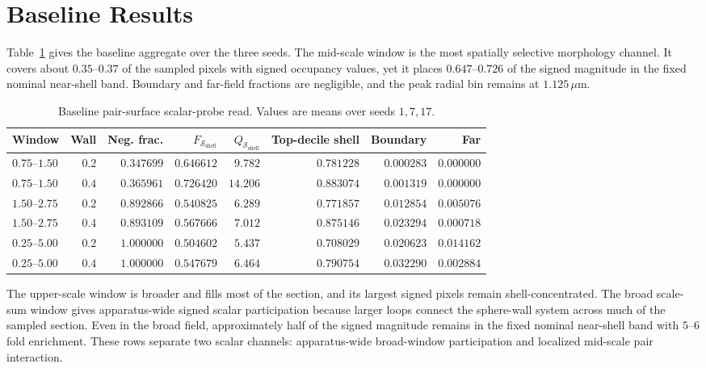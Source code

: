 \documentclass[11pt]{article}
\newcommand{\um}{\,\mu\mathrm{m}}
\newcommand{\shell}{\mathcal{S}_{\mathrm{shell}}}
\begin{document}
\section{Baseline Results}

Table~\ref{tab:baseline} gives the baseline aggregate over the three seeds.
The mid-scale window is the most spatially selective morphology channel. It covers about
$0.35$--$0.37$ of the sampled pixels with signed occupancy values, yet it places
$0.647$--$0.726$ of the signed magnitude in the fixed nominal near-shell band.
Boundary and far-field fractions are negligible, and the peak radial bin
remains at $1.125\um$.

\begin{table}[htbp]
\centering
\caption{Baseline pair-surface scalar-probe read. Values are means over seeds $1,7,17$.}
\label{tab:baseline}
\small
\begin{tabular}{lrrrrrrr}
\toprule
Window & Wall & Neg. frac. & $F_{\shell}$ & $Q_{\shell}$ & Top-decile shell & Boundary & Far \\
\midrule
$0.75$--$1.50$ & $0.2$ & $0.347699$ & $0.646612$ & $9.782$ & $0.781228$ & $0.000283$ & $0.000000$ \\
$0.75$--$1.50$ & $0.4$ & $0.365961$ & $0.726420$ & $14.206$ & $0.883074$ & $0.001319$ & $0.000000$ \\
$1.50$--$2.75$ & $0.2$ & $0.892866$ & $0.540825$ & $6.289$ & $0.771857$ & $0.012854$ & $0.005076$ \\
$1.50$--$2.75$ & $0.4$ & $0.893109$ & $0.567666$ & $7.012$ & $0.875146$ & $0.023294$ & $0.000718$ \\
$0.25$--$5.00$ & $0.2$ & $1.000000$ & $0.504602$ & $5.437$ & $0.708029$ & $0.020623$ & $0.014162$ \\
$0.25$--$5.00$ & $0.4$ & $1.000000$ & $0.547679$ & $6.464$ & $0.790754$ & $0.032290$ & $0.002884$ \\
\bottomrule
\end{tabular}
\end{table}

The upper-scale window is broader and fills most of the section, and its
largest signed pixels remain shell-concentrated. The broad scale-sum window
gives apparatus-wide signed scalar participation because larger loops connect
the sphere-wall system across much of the sampled section. Even in the broad
field, approximately half of the signed magnitude remains in the fixed nominal
near-shell band with $5$--$6$ fold enrichment. These rows separate two scalar
channels: apparatus-wide broad-window participation and localized mid-scale
pair interaction.
\end{document}
